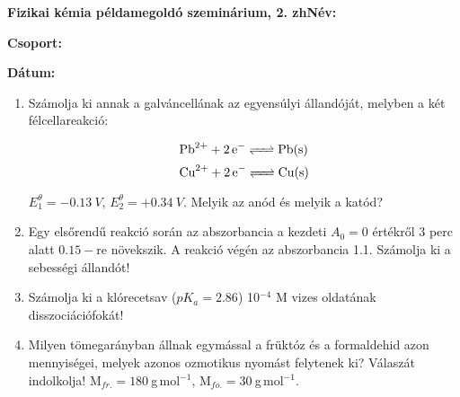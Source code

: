 \documentclass[a4paper, 11pt]{article}
\begin{document}
\textbf{Fizikai kémia példamegoldó szeminárium, 2. zh}\hfill \textbf{Név:}

\hfill \textbf{Csoport:}

\hfill \textbf{Dátum:}

\thispagestyle{empty}

\begin{enumerate}

\item Számolja ki annak a galváncellának az egyensúlyi állandóját, melyben a két félcellareakció:
 
\begin{equation}
        \ce{Pb^{2+} + 2e^- <=> Pb(s)}
\end{equation}
\begin{equation}
        \ce{Cu^{2+} + 2e^- <=> Cu(s)}
\end{equation}

$E_1^\theta=-0.13~V$, $E_2^\theta=+0.34~V$. Melyik az anód és melyik a katód? 

\item Egy elsőrendű reakció során az abszorbancia a kezdeti $A_0=0$ értékről 3 perc alatt $0.15-$re növekszik. A reakció végén az abszorbancia 1.1. Számolja ki a sebességi állandót!

\item Számolja ki a klórecetsav ($pK_a=2.86$) 10$^{-4}$ M vizes oldatának disszociációfokát!  

\item Milyen tömegarányban állnak egymással a früktóz és a formaldehid azon mennyiségei, melyek azonos ozmotikus nyomást felytenek ki? Válaszát indolkolja! M$_{fr.}=180~$g$\,$mol$^{-1}$, M$_{fo.}=30~$g$\,$mol$^{-1}$.


\end{enumerate}
\end{document}
